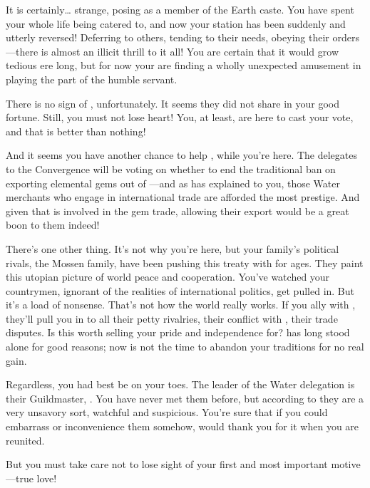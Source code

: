 \documentclass[char]{iron}
\begin{document}
It is certainly\ldots{} strange, posing as a member of the Earth caste. You have spent your whole life being catered to, and now your station has been suddenly and utterly reversed! Deferring to others, tending to their needs, obeying their orders---there is almost an illicit thrill to it all! You are certain that it would grow tedious ere long, but for now your are finding a wholly unexpected amusement in playing the part of the humble servant.

There is no sign of \cGuildmaster{\real{\first}}, unfortunately. It seems they did not share in your good fortune. Still, you must not lose heart! You, at least, are here to cast your vote, and that is better than nothing!

And it seems you have another chance to help \cGuildmaster{\real{\first}}, while you're here. The delegates to the Convergence will be voting on whether to end the traditional ban on exporting elemental gems out of \sHomeCountry{}---and as \cGuildmaster{\real{\first}} has explained to you, those Water merchants who engage in international trade are afforded the most prestige. And given that \cGuildmaster{\real{\first}} is involved in the gem trade, allowing their export would be a great boon to them indeed!

There's one other thing.  It's not why you're here, but your family's political
rivals, the Mossen family, have been pushing this treaty with \sTreatyCountry{}
for ages.  They paint this utopian picture of world peace and cooperation.
You've watched your countrymen, ignorant of the realities of international
politics, get pulled in.  But it's a load of nonsense.  That's not how the
world really works.  If you ally with \sTreatyCountry{}, they'll pull you
in to all their petty rivalries, their conflict with \sSpyCountry{}, their
trade disputes.  Is this worth selling your pride and independence for?
\sHomeCountry{} has long stood alone for good reasons; now is not the time
to abandon your traditions for no real gain.

Regardless, you had best be on your toes. The leader of the Water
delegation is their Guildmaster, \cGuildmaster{\intro}. You have never
met them before, but according to \cGuildmaster{\real{\first}} they
are a very unsavory sort, watchful and suspicious. You're sure that if
you could embarrass or inconvenience them somehow,
\cGuildmaster{\real{\first}} would thank you for it when you are
reunited.

But you must take care not to lose sight of your first and most important motive---true love!
\end{document}

